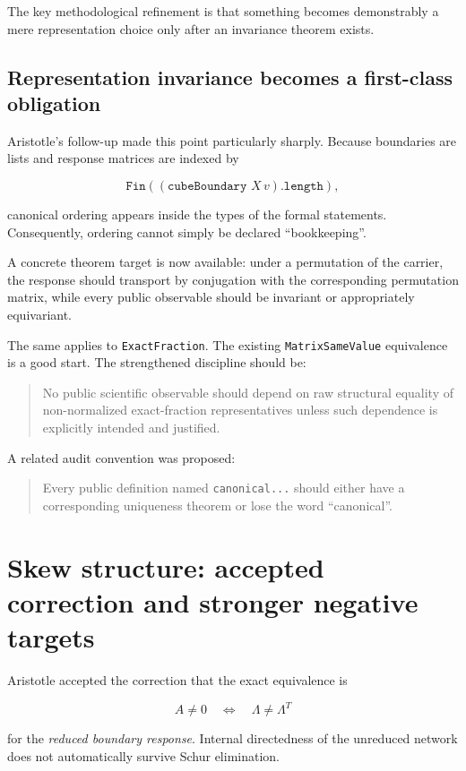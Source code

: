 \documentclass[11pt,a4paper]{article}
\begin{document}
The key methodological refinement is that something becomes demonstrably a mere representation choice only after an invariance theorem exists.

\subsection{Representation invariance becomes a first-class obligation}

Aristotle's follow-up made this point particularly sharply. Because boundaries are lists and response matrices are indexed by

\[
\texttt{Fin}((\texttt{cubeBoundary }X\,v).\texttt{length}),
\]

canonical ordering appears inside the types of the formal statements. Consequently, ordering cannot simply be declared ``bookkeeping''.

A concrete theorem target is now available: under a permutation of the carrier, the response should transport by conjugation with the corresponding permutation matrix, while every public observable should be invariant or appropriately equivariant.

The same applies to \texttt{ExactFraction}. The existing \texttt{MatrixSameValue} equivalence is a good start. The strengthened discipline should be:

\begin{quote}
No public scientific observable should depend on raw structural equality of non-normalized exact-fraction representatives unless such dependence is explicitly intended and justified.
\end{quote}

A related audit convention was proposed:

\begin{quote}
Every public definition named \texttt{canonical...} should either have a corresponding uniqueness theorem or lose the word ``canonical''.
\end{quote}

\section{Skew structure: accepted correction and stronger negative targets}

Aristotle accepted the correction that the exact equivalence is

\[
A\neq 0
\quad\Longleftrightarrow\quad
\Lambda\neq\Lambda^{T}
\]

for the \emph{reduced boundary response}. Internal directedness of the unreduced network does not automatically survive Schur elimination.
\end{document}
